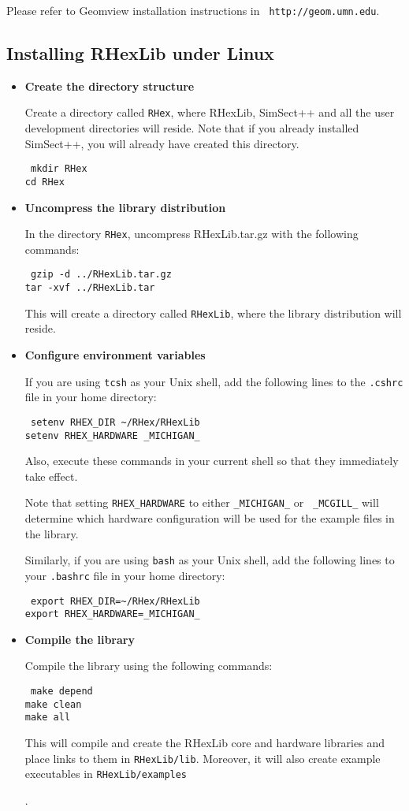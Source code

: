 Please refer to Geomview installation instructions in {\tt
  http://geom.umn.edu}.

\subsection{Installing RHexLib under Linux}

\begin{itemize}
\item{{\bf Create the directory structure}

Create a directory called {\tt RHex}, where RHexLib, SimSect++ and all the
user development directories will reside. Note that if you already installed
SimSect++, you will already have created this directory.

{\tt 
mkdir RHex \\
cd RHex
}}

\item{{\bf Uncompress the library distribution}

In the directory {\tt RHex}, uncompress RHexLib.tar.gz with the
following commands:

{\tt
gzip -d ../RHexLib.tar.gz\\
tar -xvf ../RHexLib.tar
}

This will create a directory called {\tt RHexLib}, where the library
distribution will reside.}

\item{{\bf Configure environment variables}

If you are using {\tt tcsh} as your Unix shell, add the following lines to
the {\tt .cshrc} file in your home directory:

{\tt
setenv RHEX\_DIR \~{}/RHex/RHexLib\\
setenv RHEX\_HARDWARE \_MICHIGAN\_
}

Also, execute these commands in your current shell so that they immediately
take effect.

Note that setting {\tt RHEX\_HARDWARE} to either {\tt \_MICHIGAN\_} or {\tt
\_MCGILL\_} will determine which hardware configuration will be used for the
example files in the library.

Similarly, if you are using {\tt bash} as your Unix shell, add the following
lines to your {\tt .bashrc} file in your home directory:

{\tt
export RHEX\_DIR=\~{}/RHex/RHexLib\\
export RHEX\_HARDWARE=\_MICHIGAN\_
}}

\item{{\bf Compile the library}

Compile the library using the following commands:

{\tt
make depend \\
make clean \\
make all
}

This will compile and create the RHexLib core and hardware libraries and
place links to them in {\tt RHexLib/lib}. Moreover, it will also create
example executables in {\tt RHexLib/examples} }.

\end{itemize}

